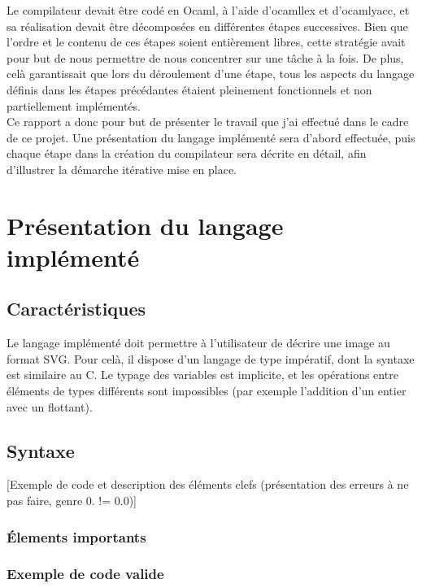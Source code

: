 \documentclass[a4paper, 12pt]{report}
\begin{document}
Le compilateur devait être codé en Ocaml, à l'aide d'ocamllex et d'ocamlyacc, et sa réalisation devait être décomposées en différentes étapes successives. Bien que l'ordre et le contenu de ces étapes soient entièrement libres, cette stratégie avait pour but de nous permettre de nous concentrer sur une tâche à la fois. De plus, celà garantissait que lors du déroulement d'une étape, tous les aspects du langage définis dans les étapes précédantes étaient pleinement fonctionnels et non partiellement implémentés.\\

Ce rapport a donc pour but de présenter le travail que j'ai effectué dans le cadre de ce projet. Une présentation du langage implémenté sera d'abord effectuée, puis chaque étape dans la création du compilateur sera décrite en détail, afin d'illustrer la démarche itérative mise en place.

\chapter{Présentation du langage implémenté}

	\section{Caractéristiques}
	
	Le langage implémenté doit permettre à l'utilisateur de décrire une image au format SVG. Pour celà, il dispose d'un langage de type impératif, dont la syntaxe est similaire au C. Le typage des variables est implicite, et les opérations entre éléments de types différents sont impossibles (par exemple l'addition d'un entier avec un flottant).
	
	\section{Syntaxe}
	
	[Exemple de code et description des éléments clefs (présentation des erreurs à ne pas faire, genre 0. != 0.0)]
	
	\subsection{\'Elements importants}
	
	
	
	\subsection{Exemple de code valide}
	
\end{document}

